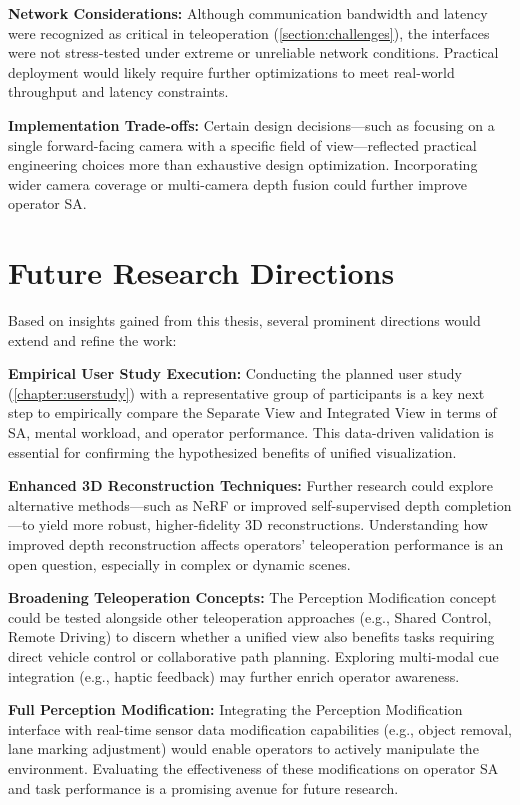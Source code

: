     \textbf{Network Considerations:}
    Although communication bandwidth and latency were recognized as critical in teleoperation (\ref{section:challenges}), the interfaces were not stress-tested under extreme or unreliable network conditions. Practical deployment would likely require further optimizations to meet real-world throughput and latency constraints.

    \textbf{Implementation Trade-offs:}
    Certain design decisions—such as focusing on a single forward-facing camera with a specific field of view—reflected practical engineering choices more than exhaustive design optimization. Incorporating wider camera coverage or multi-camera depth fusion could further improve operator \ac{SA}.

\section{Future Research Directions}

Based on insights gained from this thesis, several prominent directions would extend and refine the work:

\textbf{Empirical User Study Execution:}
Conducting the planned user study (\ref{chapter:userstudy}) with a representative group of participants is a key next step to empirically compare the Separate View and Integrated View in terms of \ac{SA}, mental workload, and operator performance. This data-driven validation is essential for confirming the hypothesized benefits of unified visualization.

\textbf{Enhanced 3D Reconstruction Techniques:}
Further research could explore alternative methods—such as \ac{NeRF} or improved self-supervised depth completion—to yield more robust, higher-fidelity 3D reconstructions. Understanding how improved depth reconstruction affects operators’ teleoperation performance is an open question, especially in complex or dynamic scenes.

\textbf{Broadening Teleoperation Concepts:}
The Perception Modification concept could be tested alongside other teleoperation approaches (e.g., Shared Control, Remote Driving) to discern whether a unified view also benefits tasks requiring direct vehicle control or collaborative path planning. Exploring multi-modal cue integration (e.g., haptic feedback) may further enrich operator awareness.

\textbf{Full Perception Modification:}
Integrating the Perception Modification interface with real-time sensor data modification capabilities (e.g., object removal, lane marking adjustment) would enable operators to actively manipulate the environment. Evaluating the effectiveness of these modifications on operator \ac{SA} and task performance is a promising avenue for future research.

